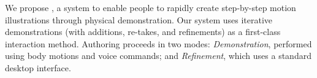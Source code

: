 


%

We propose \systemname{}, a system to enable people to rapidly create step-by-step motion illustrations through physical demonstration.
Our system uses iterative demonstrations (with additions, re-takes, and refinements) as a first-class interaction method.
Authoring proceeds in two modes: {\em Demonstration}, performed using body motions and voice commands; and {\em Refinement}, which uses a standard desktop interface.
%

